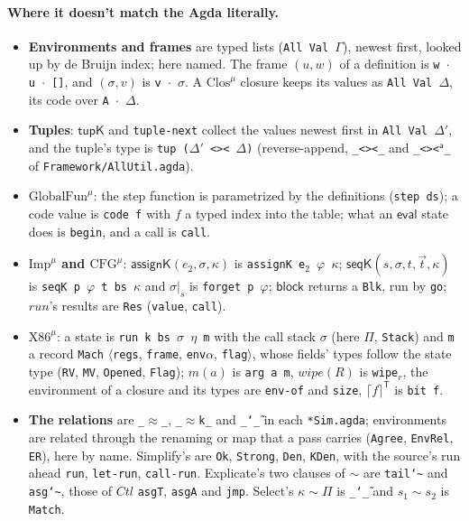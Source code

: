 \documentclass[10pt]{article}
\theoremstyle{acmplain}
\newcommand{\key}[1]{\mathsf{#1}}
\newcommand{\Kf}[2]{\key{#1}(#2)}
\newcommand{\Tcut}[2]{#1|_{#2}}                %
\newcommand{\Tres}[1]{\lceil #1 \rceil^{\mathsf{T}}}      %
\newcommand{\Twipe}[1]{\mathit{wipe}(#1)}
\newcommand{\Ml}[1]{\textrm{#1}^{\mu}}                  %
\begin{document}
\paragraph{Where it doesn't match the Agda literally.}
\begin{itemize}
\item \textbf{Environments and frames} are typed lists (\texttt{All Val
  $\Gamma$}), newest first, looked up by de Bruijn index; here named. The
  frame $(u, w)$ of a definition is \texttt{w $\cdot$ u $\cdot$ []}, and
  $(\sigma, v)$ is \texttt{v $\cdot$ $\sigma$}. A $\Ml{Clos}$ closure keeps its
  values as \texttt{All Val $\Delta$}, its code over \texttt{A $\cdot$ $\Delta$}.
\item \textbf{Tuples}: $\key{tupK}$ and \texttt{tuple-next} collect the values
  newest first in \texttt{All Val $\Delta'$}, and the tuple's type is
  \texttt{tup ($\Delta'$ <>< $\Delta$)} (reverse-append, \texttt{\_<><\_} and
  \texttt{\_<><$^{\mathsf{a}}$\_} of \texttt{Framework/AllUtil.agda}).
\item \textbf{$\Ml{GlobalFun}$}: the step function is parametrized by the
  definitions (\texttt{step ds}); a code value is \texttt{code f} with $f$ a
  typed index into the table; what an $\key{eval}$ state does is
  \texttt{begin}, and a call is \texttt{call}.
\item \textbf{$\Ml{Imp}$ and $\Ml{CFG}$}: $\Kf{assignK}{e_2, \sigma, \kappa}$
  is \texttt{assignK e$_2$ $\varphi$ $\kappa$}; $\Kf{seqK}{s, \sigma, t,
  \vec{t}, \kappa}$ is \texttt{seqK p $\varphi$ t bs $\kappa$} and
  $\Tcut{\sigma}{s}$ is \texttt{forget p $\varphi$}; $\key{block}$ returns a
  \texttt{Blk}, run by \texttt{go}; $\mathit{run}$'s results are \texttt{Res}
  (\texttt{value}, \texttt{call}).
\item \textbf{$\Ml{X86}$}: a state is \texttt{run k bs $\sigma$ $\eta$ m} with
  the call stack $\sigma$ (here $\Pi$, \texttt{Stack}) and \texttt{m} a
  record \texttt{Mach} $\langle$\texttt{regs}, \texttt{frame},
  \texttt{env$\alpha$}, \texttt{flag}$\rangle$, whose fields' types follow the
  state type (\texttt{RV}, \texttt{MV}, \texttt{Opened}, \texttt{Flag}); $m(a)$
  is \texttt{arg a m}, $\Twipe{R}$ is \texttt{wipe$_r$}, the environment of a
  closure and its types are \texttt{env-of} and \texttt{size}, $\Tres{f}$ is
  \texttt{bit f}.
\item \textbf{The relations} are \texttt{\_$\approx$\_}, \texttt{\_$\approx$k\_}
  and \texttt{\_\char`\~\_} in each \texttt{*Sim.agda}; environments are related
  through the renaming or map that a pass carries (\texttt{Agree},
  \texttt{EnvRel}, \texttt{ER}), here by name. Simplify's are
  \texttt{Ok}, \texttt{Strong}, \texttt{Den}, \texttt{KDen}, with the source's
  run ahead \texttt{run}, \texttt{let-run}, \texttt{call-run}.
  Explicate's two clauses of $\sim$ are \texttt{tail\char`\~} and
  \texttt{asg\char`\~}, those of $\mathit{Ctl}$ \texttt{asgT}, \texttt{asgA}
  and \texttt{jmp}. Select's $\kappa \sim \Pi$ is \texttt{\_\char`\~\_} and
  $s_1 \sim s_2$ is \texttt{Match}.
\end{itemize}
\end{document}
